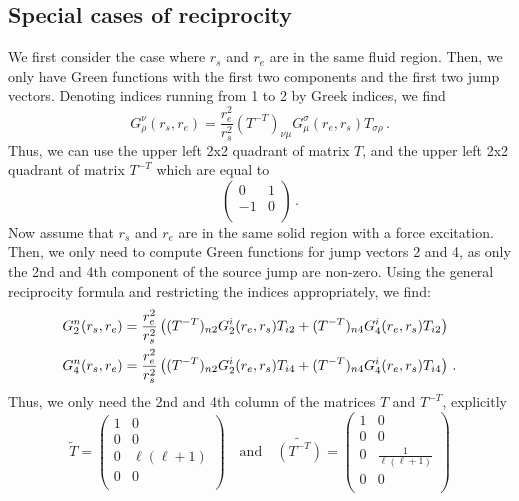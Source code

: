 \documentclass[11pt,a4paper]{article}
\begin{document}
\subsection{Special cases of reciprocity}
% 
We first consider the case where $r_s$ and $r_e$ are in the same fluid region. Then, we only have Green functions with the first two
components and the first two jump vectors. Denoting indices running from 1 to 2 by Greek indices, we find
\begin{equation}
G_\rho^\nu(r_s,r_e) = \frac{r_e^2}{r_s^2} (T^{-T})_{\nu\mu} G_\mu^\sigma(r_e,r_s) T_{\sigma\rho}\,.
\end{equation}
Thus, we can use the upper left 2x2 quadrant of matrix $T$, and the upper left 2x2 quadrant of matrix $T^{-T}$ which are equal to
\begin{equation}
\left(\begin{array}{cc}
0 & 1  \\
-1 & 0 \\
\end{array}\right) \,.
\end{equation}
Now assume that $r_s$ and $r_e$ are in the same solid region with a force excitation. Then, we only need to compute Green functions
for jump vectors 2 and 4, as only the 2nd and 4th component of the source jump are non-zero. Using the general reciprocity formula and
restricting the indices appropriately, we find:
\begin{align}
G_2^n(r_s,r_e) &= \frac{r_e^2}{r_s^2}\left( (T^{-T})_{n2} G_2^i(r_e,r_s) T_{i2} + (T^{-T})_{n4} G_4^i(r_e,r_s) T_{i2} \right) \notag\\
G_4^n(r_s,r_e) &= \frac{r_e^2}{r_s^2}\left( (T^{-T})_{n2} G_2^i(r_e,r_s) T_{i4} + (T^{-T})_{n4} G_4^i(r_e,r_s) T_{i4} \right) \,.
\end{align}
Thus, we only need the 2nd and 4th column of the matrices $T$ and $T^{-T}$, explicitly
\begin{equation}
\tilde{T} = \left(\begin{array}{cc}
1 & 0 \\
0 & 0 \\
0 & \ell(\ell+1) \\
0 & 0 \\
\end{array}\right)\quad \mathrm{and}\quad 
\tilde{(T^{-T})} = \left(\begin{array}{cc}
1 & 0 \\
0 & 0 \\
0 & \frac{1}{\ell(\ell+1)} \\
0 & 0 \\
\end{array}\right)
\end{equation}
\end{document}
